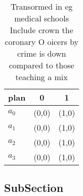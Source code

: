 \documentclass[a4paper]{article}
\begin{document}
\begin{table}
\begin{adjustbox}{width=0.9\columnwidth}
\begin{tabular}{|l|l|l|}
\hline
\textbf{plan} & \multicolumn{1}{c|}{\textbf{0}} & \multicolumn{1}{c|}{\textbf{1}} \\ \hline
\textbf{$a_0$}  & (0,0) & (1,0) \\ \hline
\textbf{$a_1$}  & (0,0) & (1,0) \\ \hline
\textbf{$a_2$}  & (0,0) & (1,0) \\ \hline
\textbf{$a_3$}  & (0,0) & (1,0) \\ \hline
\end{tabular}
\end{adjustbox}
\caption{Transormed in eg medical schools Include crown the coronary O oicers by crime is down compared to those teaching a mix 
}
\end{table}

\subsection{SubSection}
\end{document}
